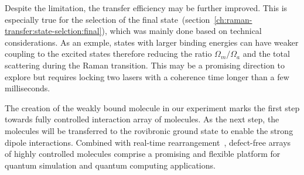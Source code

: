 Despite the limitation, the transfer efficiency may be further improved.
This is especially true for the selection
of the final state~(section~\ref{ch:raman-transfer:state-selction:final}),
which was mainly done based on technical considerations.
As an exmple, states with larger binding energies can have weaker coupling
to the excited states therefore reducing the ratio $\Omega_m/\Omega_a$
and the total scattering during the Raman transition.
This may be a promising direction to explore
but requires locking two lasers with a coherence time longer than a few milliseconds.

The creation of the weakly bound molecule in our experiment marks
the first step towards fully controlled interaction array of molecules.
As the next step, the molecules will be transferred to the rovibronic ground state
to enable the strong dipole interactions.
Combined with real-time rearrangement~\cite{barredo_atom-by-atom_2016,endres_atom-by-atom_2016},
defect-free arrays of highly controlled molecules comprise a promising
and flexible platform for quantum simulation and quantum computing applications.
